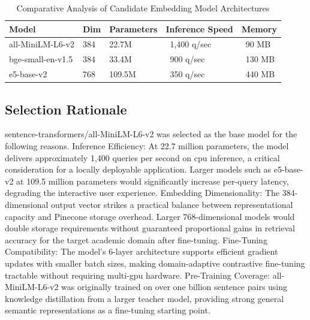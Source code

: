 \begin{table}[H]

\centering

\caption{Comparative Analysis of Candidate Embedding Model Architectures}

\label{tab:basemodels}

\begin{tabular}{|p{3.5cm}|p{2cm}|p{2cm}|p{2.5cm}|p{3cm}|}

\hline

\textbf{Model} & \textbf{Dim} & \textbf{Parameters} & \textbf{Inference Speed} & \textbf{Memory} \\

\hline

all-MiniLM-L6-v2 & 384 & 22.7M & ~1,400 q/sec & ~90 MB \\

\hline

bge-small-en-v1.5 & 384 & 33.4M & ~900 q/sec & ~130 MB \\

\hline

e5-base-v2 & 768 & 109.5M & ~350 q/sec & ~440 MB \\

\hline

\end{tabular}

\end{table}

\subsection{Selection Rationale}

sentence-transformers/all-MiniLM-L6-v2 was selected as the base model for the following reasons.
\newline \newline Inference Efficiency: At 22.7 million parameters, the model delivers approximately 1,400 queries per second on \gls{cpu} inference, a critical consideration for a locally deployable application. Larger models such as e5-base-v2 at 109.5 million parameters would significantly increase per-query latency, degrading the interactive user experience.
\newline \newline Embedding Dimensionality: The 384-dimensional output vector strikes a practical balance between representational capacity and Pinecone storage overhead. Larger 768-dimensional models would double storage requirements without guaranteed proportional gains in retrieval accuracy for the target academic domain after fine-tuning.
\newline \newline Fine-Tuning Compatibility: The model's 6-layer architecture supports efficient gradient updates with smaller batch sizes, making domain-adaptive contrastive fine-tuning tractable without requiring multi-\gls{gpu} hardware.
\newline \newline Pre-Training Coverage: all-MiniLM-L6-v2 was originally trained on over one billion sentence pairs using knowledge distillation from a larger teacher model, providing strong general semantic representations as a fine-tuning starting point.


